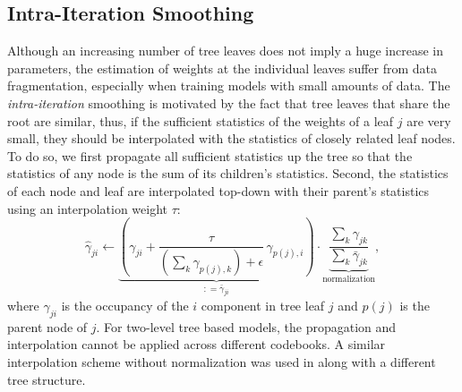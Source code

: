\documentclass{article}
\begin{document}
\subsection{Intra-Iteration Smoothing}
Although an increasing number of tree leaves does not imply a huge increase in
parameters, the estimation of weights at the individual leaves suffer from data 
fragmentation, especially when training models with small amounts of data.
The {\em intra-iteration} smoothing is motivated by the fact that tree leaves
that share the root are similar, thus, if the sufficient statistics of the
weights of a leaf $j$ are very small, they should be interpolated with the 
statistics of closely related leaf nodes.
To do so, we first propagate all sufficient statistics up the tree so that the
statistics of any node is the sum of its children's statistics.
Second, the statistics of each node and leaf are interpolated top-down with 
their parent's statistics using an interpolation weight $\tau$:
\begin{equation} \label{eq:intra}
\hat\gamma_{ji} \leftarrow 
  \underbrace{\left(\gamma_{ji} + \frac{\tau}{\left( \sum_k \gamma_{p(j),k} \right) + \epsilon} \, \gamma_{p(j),i}\right)}_{\mathrel{\mathop{:}}= \bar\gamma_{ji}}
  \cdot 
  \underbrace{\frac{\sum_k \gamma_{jk}}{\sum_k \bar\gamma_{jk}}}_\text{normalization},
\end{equation}
where $\gamma_{ji}$ is the occupancy of the $i$ component in tree leaf $j$
and $p(j)$ is the parent node of $j$.
%
For two-level tree based models, the propagation and interpolation cannot
be applied across different codebooks. 
%
A similar interpolation scheme without normalization was used in 
\cite{schukattalamazzini1994srf,schukattalamazzini1995as} along with a different
tree structure.

\end{document}
